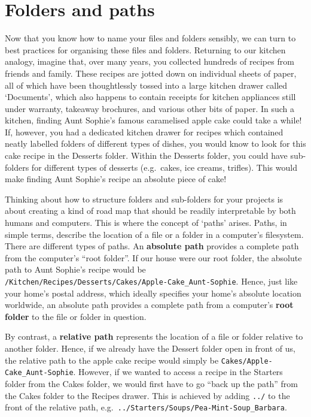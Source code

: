 \documentclass[
  letterpaper,
  DIV=11,
  numbers=noendperiod]{scrreprt}
\begin{document}
\section{Folders and paths}\label{sec-FoldersPaths}

Now that you know how to name your files and folders sensibly, we can
turn to best practices for organising these files and folders. Returning
to our kitchen analogy, imagine that, over many years, you collected
hundreds of recipes from friends and family. These recipes are jotted
down on individual sheets of paper, all of which have been thoughtlessly
tossed into a large kitchen drawer called `Documents', which also
happens to contain receipts for kitchen appliances still under warranty,
takeaway brochures, and various other bits of paper. In such a kitchen,
finding Aunt Sophie's famous caramelised apple cake could take a while!
If, however, you had a dedicated kitchen drawer for recipes which
contained neatly labelled folders of different types of dishes, you
would know to look for this cake recipe in the Desserts folder. Within
the Desserts folder, you could have sub-folders for different types of
desserts (e.g.~cakes, ice creams, trifles). This would make finding Aunt
Sophie's recipe an absolute piece of cake!

Thinking about how to structure folders and sub-folders for your
projects is about creating a kind of road map that should be readily
interpretable by both humans and computers. This is where the concept of
`paths' arises. Paths, in simple terms, describe the location of a file
or a folder in a computer's filesystem. There are different types of
paths. An \textbf{absolute path} provides a complete path from the
computer's ``root folder''. If our house were our root folder, the
absolute path to Aunt Sophie's recipe would be
\texttt{/Kitchen/Recipes/Desserts/Cakes/Apple-Cake\_Aunt-Sophie}. Hence,
just like your home's postal address, which ideally specifies your
home's absolute location worldwide, an absolute path provides a complete
path from a computer's \textbf{root folder} to the file or folder in
question.

By contrast, a \textbf{relative path} represents the location of a file
or folder relative to another folder. Hence, if we already have the
Dessert folder open in front of us, the relative path to the apple cake
recipe would simply be \texttt{Cakes/Apple-Cake\_Aunt-Sophie}. However,
if we wanted to access a recipe in the Starters folder from the Cakes
folder, we would first have to go ``back up the path'' from the Cakes
folder to the Recipes drawer. This is achieved by adding \texttt{../} to
the front of the relative path,
e.g.~\texttt{../Starters/Soups/Pea-Mint-Soup\_Barbara}.
\end{document}
